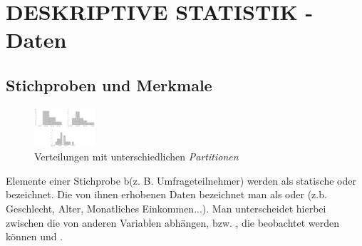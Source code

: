 \section{\textbf{DESKRIPTIVE STATISTIK} - Daten}
\subsection{Stichproben und Merkmale}
\begin{figure}
    \centering
    \includegraphics[width=0.2\textwidth]{images/2.2_histogramme.png}
    \caption{Verteilungen mit unterschiedlichen \emph{Partitionen}}
    \label{fig:histogramme-binning}
    
\end{figure}
Elemente einer Stichprobe b(z. B. Umfrageteilnehmer) werden als statische  oder  bezeichnet.
Die von ihnen erhobenen Daten bezeichnet man als  oder  (z.b. Geschlecht, Alter, Monatliches Einkommen...). 
Man unterscheidet hierbei zwischen  die von anderen Variablen abhängen,  bzw. , die beobachtet werden können und .
